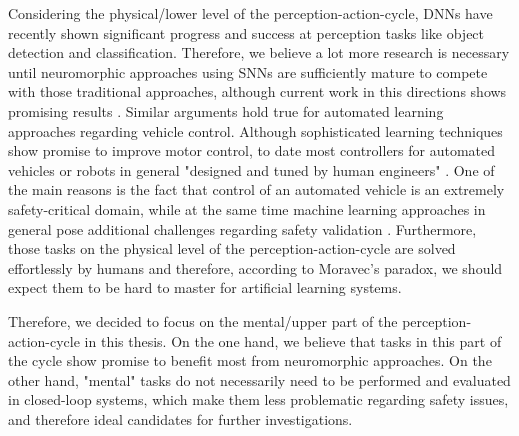 Considering the physical/lower level of the perception-action-cycle, \acp{DNN} have recently shown significant progress and success at perception tasks like object detection and classification.
Therefore, we believe a lot more research is necessary until neuromorphic approaches using \acp{SNN} are sufficiently mature to compete with those traditional approaches, although current work in this directions shows promising results \cite{Hunsberger2015}.
Similar arguments hold true for automated learning approaches regarding vehicle control.
Although sophisticated learning techniques show promise to improve motor control, to date most controllers for automated vehicles or robots in general "designed and tuned by human engineers" \cite{Deisenroth2013}.
One of the main reasons is the fact that control of an automated vehicle is an extremely safety-critical domain, while at the same time machine learning approaches in general pose additional challenges regarding safety validation \cite{Koopman2016}.
Furthermore, those tasks on the physical level of the perception-action-cycle are solved effortlessly by humans and therefore, according to Moravec's paradox, we should expect them to be hard to master for artificial learning systems.

Therefore, we decided to focus on the mental/upper part of the perception-action-cycle in this thesis.
On the one hand, we believe that tasks in this part of the cycle show promise to benefit most from neuromorphic approaches.
On the other hand, "mental" tasks do not necessarily need to be performed and evaluated in closed-loop systems, which make them less problematic regarding safety issues, and therefore ideal candidates for further investigations.

